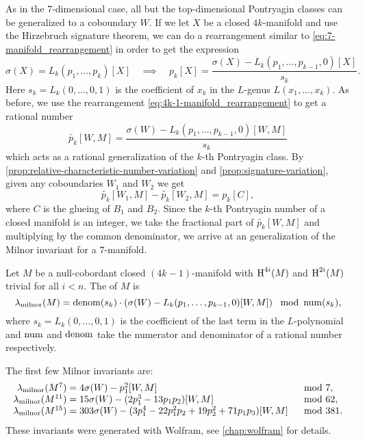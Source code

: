 As in the $7$-dimensional case, all but the top-dimensional Pontryagin classes can be generalized to a coboundary $W$.
If we let $X$ be a closed $4k$-manifold and use the Hirzebruch signature theorem, we can do a rearrangement similar to \cref{eq:7-manifold_rearrangement} in order to get the expression
\begin{equation}\label{eq:4k-1-manifold_rearrangement}
	\sigma(X) = L_k(p_1, \ldots, p_k)[X]\quad\implies\quad
	p_k[X] = \frac{\sigma(X) - L_k(p_1,\ldots, p_{k-1}, 0)[X]}{s_k}.
\end{equation}
Here $s_k=L_k(0,\ldots, 0, 1)$ is the coefficient of $x_k$ in the $L$-genus $L(x_1,\ldots, x_k)$.
As before, we use the rearrangement \cref{eq:4k-1-manifold_rearrangement} to get a rational number
\[
	\widetilde{p_k}[W, M] = \frac{\sigma(W) - L_k(p_1,\ldots, p_{k-1}, 0)[W,M]}{s_k}
\]
which acts as a rational generalization of the $k$-th Pontryagin class. By \cref{prop:relative-characteristic-number-variation} and \cref{prop:signature-variation}, given any coboundaries $W_1$ and $W_2$ we get
\[
	\widetilde{p_k}[W_1, M] - \widetilde{p_k}[W_2, M] = p_k[C],
\]
where $C$ is the glueing of $B_1$ and $B_2$. Since the $k$-th Pontryagin number of a closed manifold is an integer, we take the fractional part of $\widetilde{p_k}[W,M]$ and multiplying by the common denominator, we arrive at an generalization of the Milnor invariant for a $7$-manifold.

\begin{definition}
	Let $M$ be a null-cobordant closed $(4k-1)$-manifold with $\operatorname{H}^{4i}(M)$ and $\operatorname{H}^{2i}(M)$ trivial for all $i<n$. The  of $M$ is
	\[
		\lambda_{\mathrm{milnor}}(M) = \operatorname{denom}(s_k)\cdot \left(\sigma(W) - L_k(p_1, \ldots, p_{k-1},0)[W,M]\right)\mod {\operatorname{num}}(s_k),
	\]
	where $s_k = L_k(0,\ldots,0,1)$ is the coefficient of the last term in the $L$-polynomial and $\operatorname{num}$ and $\operatorname{denom}$ take the numerator and denominator of a rational number respectively.
\end{definition}

\begin{example}
	The first few Milnor invariants are:
	\[
		\begin{array}{r@{\;}ll}
			\milinv(M^7)
			 &= 4\sigma(W) - p_1^2[W, M]
			 & \mod 7,                                                            \\
			\milinv(M^{11})
			 &= 15\sigma(W) - (2p_1^3-13p_1p_2)[W,M]
			 & \mod 62,                                                          \\
			\milinv(M^{15})
			 &= 303\sigma(W) - (3p_1^4-22p_1^2p_2 + 19p_2^2 + 71p_1p_3)[W,M]
			 & \mod 381.
		\end{array}
	\]
	These invariants were generated with Wolfram, see \cref{chap:wolfram} for details.
\end{example}


